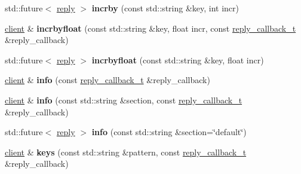 \begin{DoxyCompactItemize}
\item 
\mbox{\label{classcpp__redis_1_1client_ab7dbabc00708da38938bb461b195f177}} 
std\+::future$<$ \hyperlink{classcpp__redis_1_1reply}{reply} $>$ {\bfseries incrby} (const std\+::string \&key, int incr)
\item 
\mbox{\label{classcpp__redis_1_1client_a3ae6ca0b7896748a8fe5a450550c422e}} 
\hyperlink{classcpp__redis_1_1client}{client} \& {\bfseries incrbyfloat} (const std\+::string \&key, float incr, const \hyperlink{classcpp__redis_1_1client_a061a1140d36d2eaeda82b09a0bb3f9f2}{reply\+\_\+callback\+\_\+t} \&reply\+\_\+callback)
\item 
\mbox{\label{classcpp__redis_1_1client_a32c78234437f7f02492e3e01dd44bc43}} 
std\+::future$<$ \hyperlink{classcpp__redis_1_1reply}{reply} $>$ {\bfseries incrbyfloat} (const std\+::string \&key, float incr)
\item 
\mbox{\label{classcpp__redis_1_1client_aaa98ba6f8936eaa013ca0df553199f85}} 
\hyperlink{classcpp__redis_1_1client}{client} \& {\bfseries info} (const \hyperlink{classcpp__redis_1_1client_a061a1140d36d2eaeda82b09a0bb3f9f2}{reply\+\_\+callback\+\_\+t} \&reply\+\_\+callback)
\item 
\mbox{\label{classcpp__redis_1_1client_af276159a3938c97e5318dff39a9084ae}} 
\hyperlink{classcpp__redis_1_1client}{client} \& {\bfseries info} (const std\+::string \&section, const \hyperlink{classcpp__redis_1_1client_a061a1140d36d2eaeda82b09a0bb3f9f2}{reply\+\_\+callback\+\_\+t} \&reply\+\_\+callback)
\item 
\mbox{\label{classcpp__redis_1_1client_aa0186723d51c8b3c92979537e8ad43b9}} 
std\+::future$<$ \hyperlink{classcpp__redis_1_1reply}{reply} $>$ {\bfseries info} (const std\+::string \&section=\char`\"{}default\char`\"{})
\item 
\mbox{\label{classcpp__redis_1_1client_acb7845a206b2321e6919c2f38282c322}} 
\hyperlink{classcpp__redis_1_1client}{client} \& {\bfseries keys} (const std\+::string \&pattern, const \hyperlink{classcpp__redis_1_1client_a061a1140d36d2eaeda82b09a0bb3f9f2}{reply\+\_\+callback\+\_\+t} \&reply\+\_\+callback)

\end{DoxyCompactItemize}
